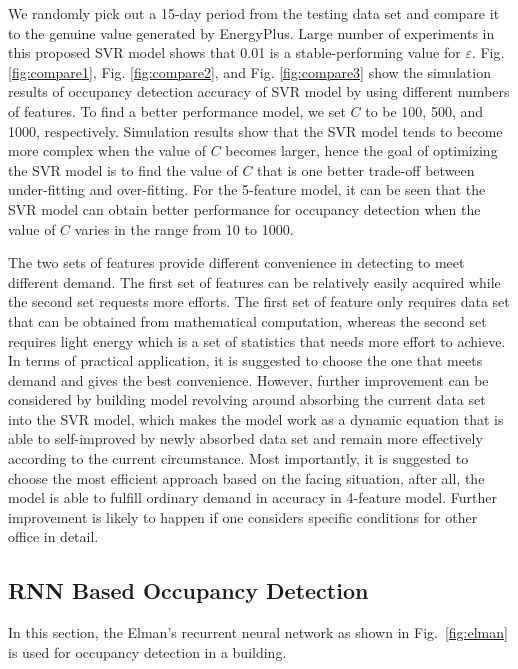 We randomly pick out a 15-day period from the testing data set and compare it
to the genuine value generated by EnergyPlus. Large number of experiments in
this proposed SVR model shows that 0.01 is a stable-performing value for
$\varepsilon$. Fig. \ref{fig:compare1}, Fig. \ref{fig:compare2}, and Fig.
\ref{fig:compare3} show the simulation results of occupancy detection accuracy
of SVR model by using different numbers of features. To find a better
performance model, we set $C$ to be 100, 500, and 1000, respectively.
Simulation results show that the SVR model tends to become more complex when
the value of $C$ becomes larger, hence the goal of optimizing the SVR model is
to find the value of $C$ that is one better trade-off between under-fitting and
over-fitting. For the 5-feature model, it can be seen that the SVR model can
obtain better performance for occupancy detection when the value of $C$ varies
in the range from 10 to 1000.

The two sets of features provide different convenience in detecting to meet
different demand. The first set of features  can be relatively easily acquired
while the second set requests more efforts. The first set of feature only
requires data set that can be obtained from mathematical computation, whereas the
second set  requires light energy which is a set of statistics that needs more
effort to achieve. In terms of practical application, it is suggested to choose
the one that meets demand and gives the best convenience. However, further
improvement can be considered by building model revolving around absorbing the
current data set into the SVR model, which makes the model work as a dynamic
equation that is able to self-improved by newly absorbed data set and remain
more effectively according to the current circumstance. Most importantly, it is
suggested to choose the most efficient approach based on the facing situation,
after all, the model is able to fulfill ordinary demand in accuracy in
4-feature model. Further improvement is likely to happen if one considers
specific conditions for other office in detail.

\subsection{RNN Based Occupancy Detection}
\label{sec:rnn-method}

In this section, the Elman's recurrent neural network as shown in
Fig.~\ref{fig:elman} is used for occupancy detection in a building.

